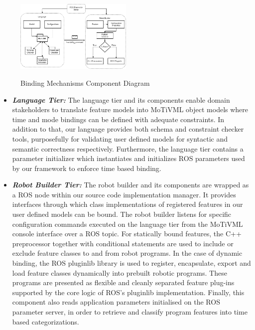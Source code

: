 \documentclass[conference]{IEEEtran}
\begin{document}
\begin{figure}[H]
	\caption{Binding Mechanisms Component Diagram}
	\centering
	\includegraphics[width=0.5\textwidth]{diagrams/mecha-compo.png}
	\label{mecha-compo}
\end{figure}

\begin{itemize}
	\item \textit{\textbf{Language Tier:}}
	The language tier and its components enable domain stakeholders to translate feature models into MoTiVML object models where time and mode bindings can be defined with adequate constraints. In addition to that, our language provides both schema and constraint checker tools, purposefully for validating user defined models for syntactic and semantic correctness respectively. Furthermore, the language tier contains a parameter initializer which instantiates and initializes ROS parameters used by our framework to enforce time based binding.
	\item \textit{\textbf{Robot Builder Tier:}}
	The robot builder and its components are wrapped as a ROS node within our source code implementation manager. It provides interfaces through which class implementations of registered features in our user defined models can be bound. The robot builder listens for specific configuration commands executed on the language tier from the MoTiVML console interface over a ROS topic. For statically bound features, the C++ preprocessor together with conditional statements are used to include or exclude feature classes to and from robot programs.  In the case of dynamic binding, the ROS pluginlib library is used to register, encapsulate, export and load feature classes dynamically into prebuilt robotic programs. These programs are presented as flexible and cleanly separated feature plug-ins supported by the core logic of ROS's pluginlib implementation. Finally, this component also reads application parameters initialised on the ROS parameter server, in order to retrieve and classify program features into time based categorizations. 
\end{itemize}
\end{document}
